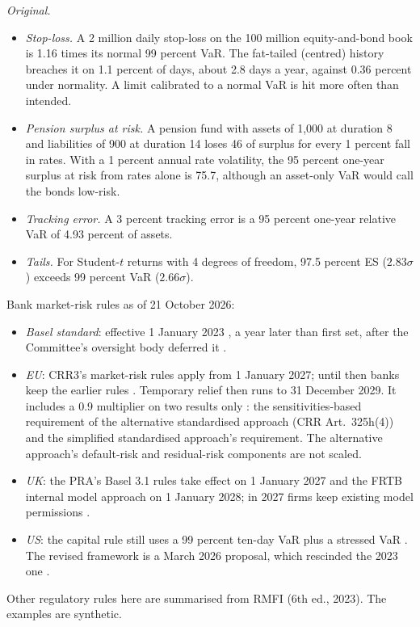 \begin{qfmethod}
\emph{Original.}
\begin{itemize}
\item \emph{Stop-loss.} A 2 million daily stop-loss on the 100 million equity-and-bond book is 1.16 times its normal 99 percent VaR. The fat-tailed (centred) history breaches it on 1.1 percent of days, about 2.8 days a year, against 0.36 percent under normality. A limit calibrated to a normal VaR is hit more often than intended.
\item \emph{Pension surplus at risk.} A pension fund with assets of 1{,}000 at duration 8 and liabilities of 900 at duration 14 loses 46 of surplus for every 1 percent fall in rates. With a 1 percent annual rate volatility, the 95 percent one-year surplus at risk from rates alone is 75.7, although an asset-only VaR would call the bonds low-risk.
\item \emph{Tracking error.} A 3 percent tracking error is a 95 percent one-year relative VaR of 4.93 percent of assets.
\item \emph{Tails.} For Student-$t$ returns with 4 degrees of freedom, 97.5 percent ES ($2.83\sigma$) exceeds 99 percent VaR ($2.66\sigma$).
\end{itemize}

 Bank market-risk rules as of 21 October 2026:
\begin{itemize}
\item \emph{Basel standard}: effective 1 January 2023 \citep[MAR90.1]{basel-framework-ccr-mar-2026}, a year later than first set, after the Committee's oversight body deferred it \citep[press release, 27 March 2020]{bcbs-ghos-deferral-2020}.
\item \emph{EU}: CRR3's market-risk rules apply from 1 January 2027; until then banks keep the earlier rules \citep[Art.~1, CRR Art.~520a]{eu-2025-1496-frtb-date}. Temporary relief then runs to 31 December 2029. It includes a 0.9 multiplier on two results only \citep[Art.~1, inserting CRR Art.~495s(1)--(2)]{eu-2026-1221-frtb-relief}: the sensitivities-based requirement of the alternative standardised approach (CRR Art.~325h(4)) and the simplified standardised approach's requirement. The alternative approach's default-risk and residual-risk components \citep[Art.~1, CRR Art.~325c(2)]{eu-2019-876-crr2} are not scaled.
\item \emph{UK}: the PRA's Basel 3.1 rules take effect on 1 January 2027 and the FRTB internal model approach on 1 January 2028; in 2027 firms keep existing model permissions \citep[paras~1.23--1.24 and~3.4]{pra-ps1-26-basel31-2026}.
\item \emph{US}: the capital rule still uses a 99 percent ten-day VaR plus a stressed VaR \citep[12 CFR 217.204--217.205]{ecfr-12cfr217-2026}. The revised framework is a March 2026 proposal, which rescinded the 2023 one \citep[p.~14955]{us-capital-proposal-2026}.
\end{itemize}
Other regulatory rules here are summarised from RMFI (6th ed., 2023). The examples are synthetic.


\end{qfmethod}
